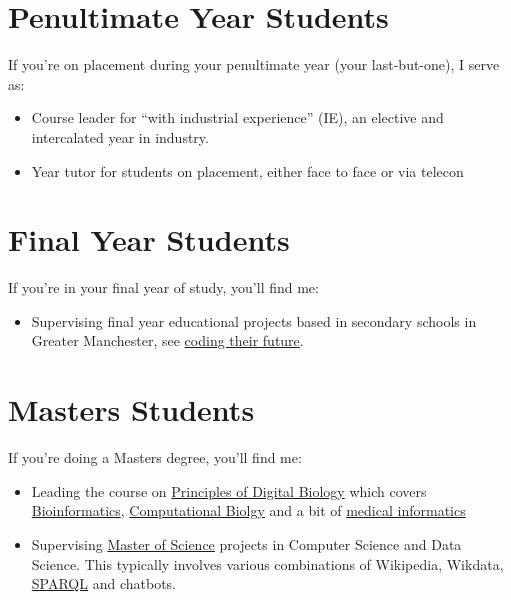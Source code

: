 \documentclass[
  12pt,
]{book}
\providecommand{\tightlist}{%
  \setlength{\itemsep}{0pt}\setlength{\parskip}{0pt}}
\begin{document}
\hypertarget{penultimate}{%
\section{Penultimate Year Students}\label{penultimate}}

If you're on placement during your penultimate year (your last-but-one), I serve as:

\begin{itemize}
\tightlist
\item
  Course leader for ``with industrial experience'' (IE), an elective and intercalated year in industry.
\item
  Year tutor for students on placement, either face to face or via telecon
\end{itemize}

\hypertarget{finalyear}{%
\section{Final Year Students}\label{finalyear}}

If you're in your final year of study, you'll find me:

\begin{itemize}
\tightlist
\item
  Supervising final year educational projects based in secondary schools in Greater Manchester, see \href{https://personalpages.manchester.ac.uk/staff/duncan.hull/coding-their-future}{coding their future}. \citep{computinged} 👩‍💻👨‍💻
\end{itemize}

\hypertarget{masters}{%
\section{Masters Students}\label{masters}}

If you're doing a Masters degree, you'll find me:

\begin{itemize}
\tightlist
\item
  Leading the course on \href{http://studentnet.cs.manchester.ac.uk/pgt/COMP60532/syllabus/}{Principles of Digital Biology} which covers \href{https://en.wikipedia.org/wiki/Bioinformatics}{Bioinformatics}, \href{https://en.wikipedia.org/wiki/Computational_biology}{Computational Biolgy} and a bit of \href{https://en.wikipedia.org/wiki/Health_informatics}{medical informatics} 🧬
\item
  Supervising \href{https://www.cs.manchester.ac.uk/study/masters/}{Master of Science} projects in Computer Science and Data Science. \citep{r4ds} This typically involves various combinations of Wikipedia, Wikdata, \href{https://en.wikipedia.org/wiki/SPARQL}{SPARQL} \citep{ducharme} and chatbots. 🤖 \citep{myca}
\end{itemize}
\end{document}
